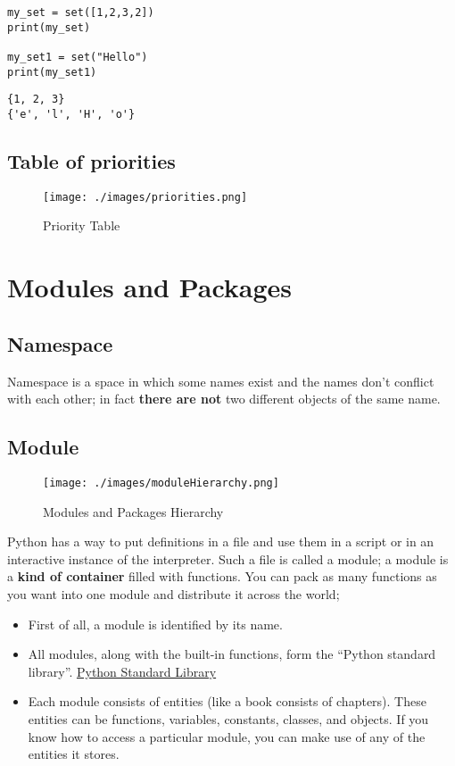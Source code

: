 \documentclass[11pt]{article}
\begin{document}
\begin{verbatim}
my_set = set([1,2,3,2])
print(my_set)

my_set1 = set("Hello")
print(my_set1)
\end{verbatim}

\begin{verbatim}
{1, 2, 3}
{'e', 'l', 'H', 'o'}
\end{verbatim}

\newpage

\subsection{Table of priorities}
\label{sec:orgb55f99d}

\begin{figure}[htbp]
\centering
\texttt{[image: ./images/priorities.png]}
\caption{Priority Table}
\end{figure}

\newpage
\section{Modules and Packages}
\label{sec:org06270ae}
\subsection{Namespace}
\label{sec:orgdf8ee7c}
Namespace is a space in which some names exist and the names don’t
conflict with each other; in fact \textbf{there are not} two different objects of the
same name.
\subsection{Module}
\label{sec:org7183366}

\begin{figure}[htbp]
\centering
\texttt{[image: ./images/moduleHierarchy.png]}
\caption{Modules and Packages Hierarchy}
\end{figure}

Python has a way to put definitions in a file and use them in a script
or in an interactive instance of the interpreter. Such a file is
called a module; a module is a \textbf{kind of container} filled with
functions. You can pack as many functions as you want into one module
and distribute it across the world;

\begin{itemize}
\item First of all, a module is identified by its name.
\item All modules, along with the built-in functions, form the
“Python standard library”. \href{https://docs.python.org/3/library/index.html}{Python Standard Library}
\item Each module consists of entities (like a book consists of
chapters). These entities can be functions, variables, constants,
classes, and objects. If you know how to access a particular module,
you can make use of any of the entities it stores.
\end{itemize}
\end{document}
